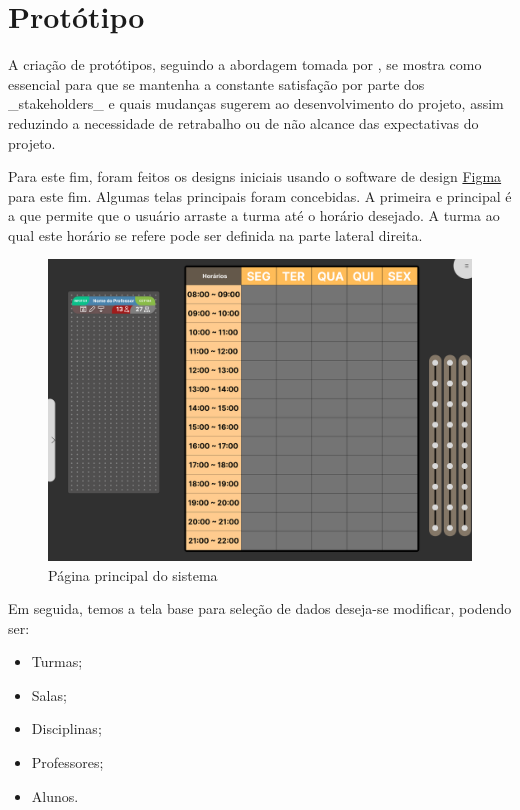 \section{Protótipo} %

    A criação de protótipos, seguindo a abordagem tomada por \cite{andre_interaction_2018}, se mostra como essencial para que se mantenha a constante satisfação por parte dos _stakeholders_ e quais mudanças sugerem ao desenvolvimento do projeto, assim reduzindo a necessidade de retrabalho ou de não alcance das expectativas do projeto.

    Para este fim, foram feitos os designs iniciais usando o software de design \href{https://www.figma.com/}{Figma} para este fim. Algumas telas principais foram concebidas. A primeira e principal é a que permite que o usuário arraste a turma até o horário desejado. A turma ao qual este horário se refere pode ser definida na parte lateral direita.

    \begin{figure}[htbp]\centering
        \caption{\label{fig:main} Página principal do sistema}
        \includegraphics[scale=0.8]{files/img/Prototipo/main.png}
    \end{figure} %

    Em seguida, temos a tela base para seleção de dados deseja-se modificar, podendo ser:

    \begin{itemize}
        \item Turmas;
        \item Salas;
        \item Disciplinas;
        \item Professores;
        \item Alunos.
    \end{itemize}

